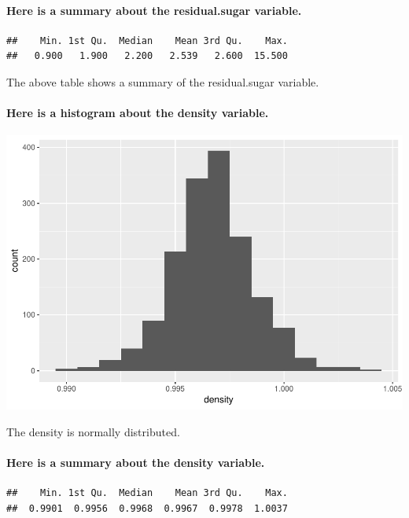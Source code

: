 \documentclass[]{article}
\let\oldparagraph\paragraph
\renewcommand{\paragraph}[1]{\oldparagraph{#1}\mbox{}}
\begin{document}
\paragraph{Here is a summary about the residual.sugar
variable.}\label{here-is-a-summary-about-the-residual.sugar-variable.}

\begin{verbatim}
##    Min. 1st Qu.  Median    Mean 3rd Qu.    Max. 
##   0.900   1.900   2.200   2.539   2.600  15.500
\end{verbatim}

The above table shows a summary of the residual.sugar variable.

\paragraph{Here is a histogram about the density
variable.}\label{here-is-a-histogram-about-the-density-variable.}

\includegraphics{RedWine_files/figure-latex/Make_Plot_Function_For_density-1.pdf}

The density is normally distributed.

\paragraph{Here is a summary about the density
variable.}\label{here-is-a-summary-about-the-density-variable.}

\begin{verbatim}
##    Min. 1st Qu.  Median    Mean 3rd Qu.    Max. 
##  0.9901  0.9956  0.9968  0.9967  0.9978  1.0037
\end{verbatim}
\end{document}
